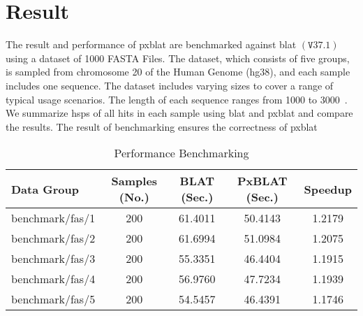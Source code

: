 \begin{listing}
	\inputminted[linenos, breaklines]{python}{codes/example1.py}
	\label{listing:example}
\end{listing}


\section*{Result}\label{sec:result}

The result and performance of \gls{pxblat} are benchmarked against \gls{blat} \(\left(\mathtt{V}37.1\right)\) using a dataset of \num[round-mode=places, round-precision=0]{1000} FASTA Files.
The dataset, which consists of five groups, is sampled from chromosome \num[round-mode=places, round-precision=0]{20} of the Human Genome (hg38), and each sample includes one sequence.
The dataset includes varying sizes to cover a range of typical usage scenarios.
The length of each sequence ranges from \num[round-mode=places, round-precision=0]{1000} to \num[round-mode=places, round-precision=0]{3000}~.
We summarize \glspl{hsp} of all hits in each sample using \gls{blat} and \gls{pxblat} and compare the results.
The result of benchmarking ensures the correctness of \gls{pxblat}~

\begin{table*}
	\centering
	\caption{Performance  Benchmarking}
	\label{tab:performance-evaluation}
	\begin{tabular}{lSSSS}
		\toprule
		Data Group      & {Samples (No.)} & {BLAT (Sec.)} & {PxBLAT (Sec.)} & {Speedup} \\
		\midrule
		benchmark/fas/1 & 200             & 61.4011       & 50.4143         & 1.2179    \\
		benchmark/fas/2 & 200             & 61.6994       & 51.0984         & 1.2075    \\
		benchmark/fas/3 & 200             & 55.3351       & 46.4404         & 1.1915    \\
		benchmark/fas/4 & 200             & 56.9760       & 47.7234         & 1.1939    \\
		benchmark/fas/5 & 200             & 54.5457       & 46.4391         & 1.1746    \\
		\bottomrule
	\end{tabular}
\end{table*}

